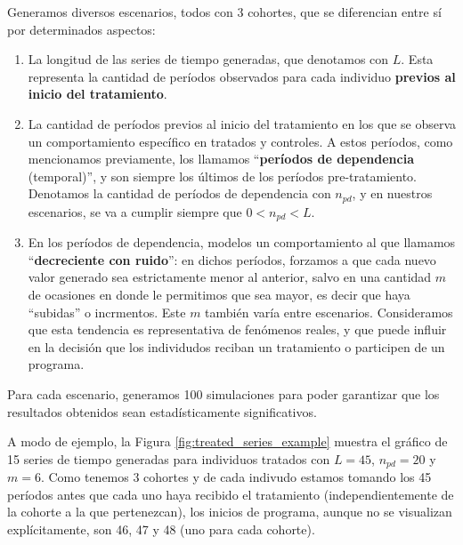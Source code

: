 \documentclass[../../main.tex]{subfiles}
\begin{document}
Generamos diversos escenarios, todos con 3 cohortes, que se diferencian entre sí por
determinados aspectos:
\begin{enumerate}[itemsep=0.05cm, label=\textbf{\arabic*.}]
    \item La longitud de las series de tiempo generadas, que denotamos con \(L\). Esta
    representa la cantidad de períodos observados para cada individuo \textbf{previos al inicio
    del tratamiento}.
    \item La cantidad de períodos previos al inicio del tratamiento en los que se observa
    un comportamiento específico en tratados y controles. A estos períodos, como
    mencionamos previamente, los llamamos ``\textbf{períodos de dependencia} (temporal)'',
    y son siempre los últimos de los períodos pre-tratamiento. Denotamos la cantidad de
    períodos de dependencia con \(n_{pd}\), y en nuestros escenarios, se va a cumplir
    siempre que \(0 < n_{pd} < L\).
    \item En los períodos de dependencia, modelos un comportamiento al que llamamos
    ``\textbf{decreciente con ruido}'': en dichos períodos, forzamos a que cada nuevo
    valor generado sea estrictamente menor al anterior, salvo en una cantidad \(m\) de
    ocasiones en donde le permitimos que sea mayor, es decir que haya ``subidas'' o
    incrmentos. Este \(m\) también varía entre escenarios. Consideramos que esta tendencia
    es representativa de fenómenos reales, y que puede influir en la decisión que
    los individudos reciban un tratamiento o participen de un programa.
\end{enumerate}
Para cada escenario, generamos 100 simulaciones para poder garantizar que los resultados
obtenidos sean estadísticamente significativos.

A modo de ejemplo, la Figura \ref{fig:treated_series_example} muestra el gráfico de 15
series de tiempo generadas para individuos tratados con \(L=45\), \(n_{pd}=20\) y \(m=6\).
Como tenemos 3 cohortes y de cada indivudo estamos tomando los 45 períodos antes que cada
uno haya recibido el tratamiento (independientemente de la cohorte a la que pertenezcan),
los inicios de programa, aunque no se visualizan explícitamente, son 46, 47 y 48 (uno para
cada cohorte).
\end{document}
